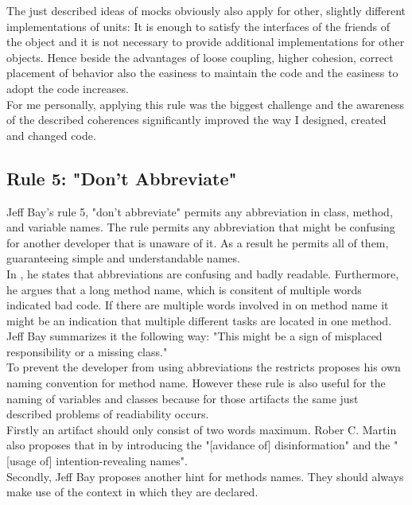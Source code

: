 The just described ideas of mocks obviously also apply for other, slightly different implementations of units: It is enough to satisfy the interfaces of the friends of the object and it is not necessary to provide additional implementations for other objects. Hence beside the advantages of loose coupling, higher cohesion, correct placement of behavior also the easiness to maintain the code and the easiness to adopt the code increases. 
\\

For me personally, applying this rule was the biggest challenge and the awareness of the described coherences significantly improved the way I designed, created and changed code. 

\subsection*{Rule 5: "Don't Abbreviate"}
Jeff Bay's rule 5, "don't abbreviate" permits any abbreviation in class, method, and variable names. The rule permits any abbreviation that might be confusing for another developer that is unaware of it. As a result he permits all of them, guaranteeing simple and understandable names.
\\

In \cite{oc2008}, he states that abbreviations are confusing and badly readable. Furthermore, he argues that a long method name, which is consitent of multiple words indicated bad code. If there are multiple words involved in on method name it might be an indication that multiple different tasks are located in one method.  Jeff Bay summarizes it the following way: "This might be a sign of misplaced responsibility or a missing class." \cite{oc2008}
\\

To prevent the developer from using abbreviations the restricts proposes his own naming convention for method name. However these rule is also useful for the naming of variables and classes because for those artifacts the same just described problems of readiability occurs.\\

Firstly an artifact should only consist of two words maximum. Rober C. Martin also proposes that in \cite[p. 19]{cc} by introducing the "[avidance of] disinformation" and the "[usage of] intention-revealing names". 
\\

Secondly, Jeff Bay proposes another hint for methods names. They should always make use of the context in which they are declared. 
\\

